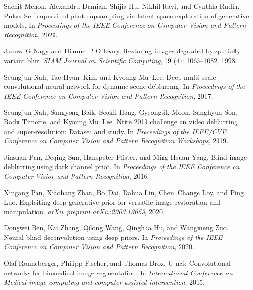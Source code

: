 \documentclass[final]{cvpr}
\begin{document}
{\begin{thebibliography}{43}
Sachit Menon, Alexandru Damian, Shijia Hu, Nikhil Ravi, and Cynthia Rudin.
\newblock Pulse: Self-supervised photo upsampling via latent space exploration
  of generative models.
\newblock In \emph{Proceedings of the {IEEE} Conference on Computer Vision and
  Pattern Recognition}, 2020.

James~G Nagy and Dianne~P O'Leary.
\newblock Restoring images degraded by spatially variant blur.
\newblock \emph{SIAM Journal on Scientific Computing}, 19
  (4): 1063--1082, 1998.

Seungjun Nah, Tae Hyun~Kim, and Kyoung Mu~Lee.
\newblock Deep multi-scale convolutional neural network for dynamic scene
  deblurring.
\newblock In \emph{Proceedings of the {IEEE} Conference on Computer Vision and
  Pattern Recognition}, 2017.

Seungjun Nah, Sungyong Baik, Seokil Hong, Gyeongsik Moon, Sanghyun Son, Radu
  Timofte, and Kyoung Mu~Lee.
\newblock Ntire 2019 challenge on video deblurring and super-resolution:
  Dataset and study.
\newblock In \emph{Proceedings of the IEEE/CVF Conference on Computer Vision
  and Pattern Recognition Workshops}, 2019.

Jinshan Pan, Deqing Sun, Hanspeter Pfister, and Ming-Hsuan Yang.
\newblock Blind image deblurring using dark channel prior.
\newblock In \emph{Proceedings of the {IEEE} Conference on Computer Vision and
  Pattern Recognition}, 2016.

Xingang Pan, Xiaohang Zhan, Bo~Dai, Dahua Lin, Chen~Change Loy, and Ping Luo.
\newblock Exploiting deep generative prior for versatile image restoration and
  manipulation.
\newblock \emph{arXiv preprint arXiv:2003.13659}, 2020.

Dongwei Ren, Kai Zhang, Qilong Wang, Qinghua Hu, and Wangmeng Zuo.
\newblock Neural blind deconvolution using deep priors.
\newblock In \emph{Proceedings of the {IEEE} Conference on Computer Vision and
  Pattern Recognition}, 2020.

Olaf Ronneberger, Philipp Fischer, and Thomas Brox.
\newblock U-net: Convolutional networks for biomedical image segmentation.
\newblock In \emph{International Conference on Medical image computing and
  computer-assisted intervention}, 2015.


\end{thebibliography}}
\end{document}
